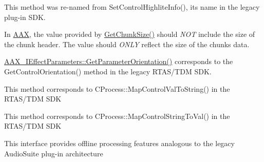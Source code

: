 \begin{DoxyRefList}
 This method was re-\/named from {\ttfamily Set\+Control\+Highlite\+Info()}, its name in the legacy plug-\/in SDK. 
\item[Member \mbox{\hyperlink{a02068_aa986711cd372febcaae803e86ae08f63}{AAX\+\_\+\+IACFEffect\+Parameters\+::Get\+Chunk\+Size}} (AAX\+\_\+\+CType\+ID i\+Chunk\+ID, uint32\+\_\+t $\ast$o\+Size) const =0]\label{a00880__porting_notes000035}%
%
 In \mbox{\hyperlink{a00950}{AAX}}, the value provided by \mbox{\hyperlink{a02068_aa986711cd372febcaae803e86ae08f63}{Get\+Chunk\+Size()}} should {\itshape NOT} include the size of the chunk header. The value should {\itshape ONLY} reflect the size of the chunk\textquotesingle{}s data. 
\item[Member \mbox{\hyperlink{a02068_ac122e1a693296b059dca4350a5ff1dfe}{AAX\+\_\+\+IACFEffect\+Parameters\+::Get\+Parameter\+Orientation}} (AAX\+\_\+\+CParam\+ID i\+Parameter\+ID, AAX\+\_\+\+EParameter\+Orientation $\ast$o\+Parameter\+Orientation) const =0]\label{a00880__porting_notes000032}%
%
 \mbox{\hyperlink{a02068_ac122e1a693296b059dca4350a5ff1dfe}{AAX\+\_\+\+IEffect\+Parameters\+::\+Get\+Parameter\+Orientation()}} corresponds to the Get\+Control\+Orientation() method in the legacy RTAS/\+TDM SDK. 
\item[Member \mbox{\hyperlink{a02068_add995f2eb5a3967c48dd9f3e21f003aa}{AAX\+\_\+\+IACFEffect\+Parameters\+::Get\+Parameter\+String\+From\+Value}} (AAX\+\_\+\+CParam\+ID i\+Parameter\+ID, double i\+Value, \mbox{\hyperlink{a02332}{AAX\+\_\+\+IString}} $\ast$o\+Value\+String, int32\+\_\+t i\+Max\+Length) const =0]\label{a00880__porting_notes000034}%
%
 This method corresponds to CProcess\+::\+Map\+Control\+Val\+To\+String() in the RTAS/\+TDM SDK 
\item[Member \mbox{\hyperlink{a02068_a54bb12c9798e4f9a3a5b5d6f30ace992}{AAX\+\_\+\+IACFEffect\+Parameters\+::Get\+Parameter\+Value\+From\+String}} (AAX\+\_\+\+CParam\+ID i\+Parameter\+ID, double $\ast$o\+Value, const \mbox{\hyperlink{a02332}{AAX\+\_\+\+IString}} \&i\+Value\+String) const =0]\label{a00880__porting_notes000033}%
%
 This method corresponds to CProcess\+::\+Map\+Control\+String\+To\+Val() in the RTAS/\+TDM SDK 
\item[Class \mbox{\hyperlink{a02092}{AAX\+\_\+\+IACFHost\+Processor}} ]\label{a00880__porting_notes000036}%
%
 This interface provides offline processing features analogous to the legacy Audio\+Suite plug-\/in architecture 

\end{DoxyRefList}
